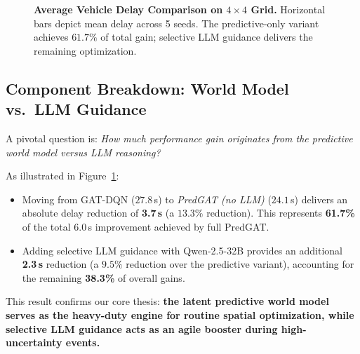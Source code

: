 \documentclass[11pt,a4paper,twocolumn]{article}
\begin{document}
\begin{figure}[t]
\centering
{}
\caption{\textbf{Average Vehicle Delay Comparison on $4\times4$ Grid.} Horizontal bars depict mean delay across 5 seeds. The predictive-only variant achieves $61.7\%$ of total gain; selective LLM guidance delivers the remaining optimization.}
\label{fig:bar_delay}
\end{figure}

\subsection{Component Breakdown: World Model vs.\ LLM Guidance}
A pivotal question is: \textit{How much performance gain originates from the predictive world model versus LLM reasoning?}

As illustrated in Figure~\ref{fig:bar_delay}:
\begin{itemize}
    \item Moving from GAT-DQN ($27.8$\,s) to \textit{PredGAT (no LLM)} ($24.1$\,s) delivers an absolute delay reduction of \textbf{3.7\,s} (a $13.3\%$ reduction). This represents \textbf{61.7\%} of the total $6.0$\,s improvement achieved by full PredGAT.
    \item Adding selective LLM guidance with Qwen-2.5-32B provides an additional \textbf{2.3\,s} reduction (a $9.5\%$ reduction over the predictive variant), accounting for the remaining \textbf{38.3\%} of overall gains.
\end{itemize}
This result confirms our core thesis: \textbf{the latent predictive world model serves as the heavy-duty engine for routine spatial optimization, while selective LLM guidance acts as an agile booster during high-uncertainty events.}
\end{document}
